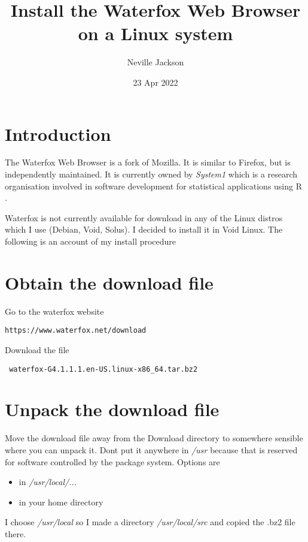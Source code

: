 \documentclass{article}  %
\title{Install the Waterfox Web Browser on a Linux system}
\author{Neville Jackson}
\date{23 Apr 2022}
\begin{document}
 

\maketitle      

\section{Introduction} 
The Waterfox Web Browser is a fork of Mozilla. It is similar to Firefox, but is independently maintained. It is currently owned by {\em System1} which is a research organisation involved in software development for statistical applications using R . 

Waterfox is not currently available for download in any of the Linux distros which I use (Debian, Void, Solus). I decided to install it in Void Linux. The following is an account of my install procedure

\section{Obtain the download file}
Go to the waterfox website~\cite{wate:22}
\begin{verbatim}
https://www.waterfox.net/download
\end{verbatim}
Download the file
\begin{verbatim}
 waterfox-G4.1.1.1.en-US.linux-x86_64.tar.bz2
\end{verbatim}

\section{Unpack the download file}
Move the download file away from the Download directory to somewhere sensible where you can unpack it. Dont put it anywhere in {\em /usr} because that is reserved for software controlled by the package system. Options are 
\begin{itemize}
\item in {\em /usr/local/...} 
\item in your home directory
\end{itemize}
I choose {\em /usr/local}  so I made a directory {\em /usr/local/src} and copied the .bz2 file there.
\end{document}
